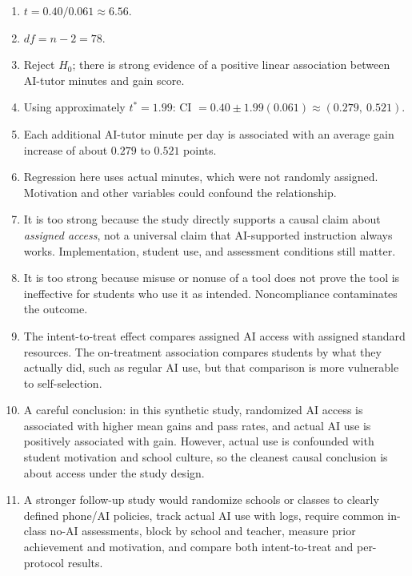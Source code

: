 \documentclass[11pt]{article}
\begin{document}
\begin{enumerate}[leftmargin=*]
\item $t = 0.40 / 0.061 \approx 6.56$.

\item $df = n - 2 = 78$.

\item Reject $H_0$; there is strong evidence of a positive linear
association between AI-tutor minutes and gain score.

\item Using approximately $t^* = 1.99$:
CI $= 0.40 \pm 1.99(0.061) \approx (0.279,\ 0.521)$.

\item Each additional AI-tutor minute per day is associated with an
average gain increase of about $0.279$ to $0.521$ points.

\item Regression here uses actual minutes, which were not randomly
assigned. Motivation and other variables could confound the
relationship.

\item It is too strong because the study directly supports a causal
claim about \emph{assigned access}, not a universal claim that
AI-supported instruction always works. Implementation, student
use, and assessment conditions still matter.

\item It is too strong because misuse or nonuse of a tool does not
prove the tool is ineffective for students who use it as intended.
Noncompliance contaminates the outcome.

\item The intent-to-treat effect compares assigned AI access with
assigned standard resources. The on-treatment association
compares students by what they actually did, such as regular AI
use, but that comparison is more vulnerable to self-selection.

\item A careful conclusion: in this synthetic study, randomized AI
access is associated with higher mean gains and pass rates, and
actual AI use is positively associated with gain. However, actual
use is confounded with student motivation and school culture, so
the cleanest causal conclusion is about access under the study
design.

\item A stronger follow-up study would randomize schools or classes
to clearly defined phone/AI policies, track actual AI use with
logs, require common in-class no-AI assessments, block by school
and teacher, measure prior achievement and motivation, and
compare both intent-to-treat and per-protocol results.
\end{enumerate}
\end{document}
